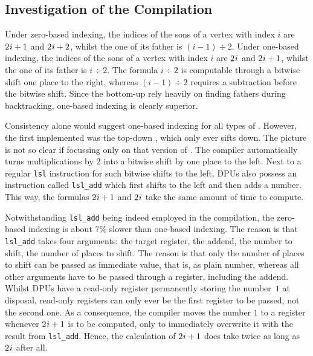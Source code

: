 \subsection*{Investigation of the Compilation}
\label{sec:tasklet:heap:compilation}

Under zero-based indexing, the indices of the sons of a vertex with index \(i\) are \(2 \mspace{1mu} i + 1\) and \(2 \mspace{1mu} i + 2\), whilst the one of its father is \((i - 1) \div 2\).
Under one-based indexing, the indices of the sons of a vertex with index \(i\) are \(2 \mspace{1mu} i\) and \(2 \mspace{1mu} i + 1\), whilst the one of its father is \(i \div 2\).
The formula \(i \div 2\) is computable through a bitwise shift one place to the right, whereas \((i - 1) \div 2\) requires a subtraction before the bitwise shift.
Since the bottom-up \HS*{} rely heavily on finding fathers during backtracking, one-based indexing is clearly superior.

Consistency alone would suggest one-based indexing for all types of \HS{}.
However, the first \HS{} implemented was the top-down \HS{}, which only ever sifts down.
The picture is not so clear if focussing only on that version of \HS{}.
The compiler automatically turns multiplications by \(2\) into a bitwise shift by one place to the left.
Next to a regular \lstinline|lsl| instruction for such bitwise shifts to the left, DPUs also possess an instruction called \lstinline|lsl_add| which first shifts to the left and then adds a number.
This way, the formulas \(2 \mspace{1mu} i + 1\) and \(2 \mspace{1mu} i\) take the same amount of time to compute.

Notwithstanding \lstinline|lsl_add| being indeed employed in the compilation, the zero-based indexing is about 7\% slower than one-based indexing.
The reason is that \lstinline|lsl_add| takes four arguments:
the target register, the addend, the number to shift, the number of places to shift.
The reason is that only the number of places to shift can be passed as immediate value, that is, as plain number, whereas all other arguments have to be passed through a register, including the addend.
Whilst DPUs have a read-only register permanently storing the number~\(1\) at disposal, read-only registers can only ever be the first register to be passed, not the second one.
As a consequence, the compiler moves the number \(1\) to a register whenever \(2 \mspace{1mu} i + 1\) is to be computed, only to immediately overwrite it with the result from \lstinline|lsl_add|.
Hence, the calculation of \(2 \mspace{1mu} i + 1\) does take twice as long as \(2 \mspace{1mu} i\) after all.

